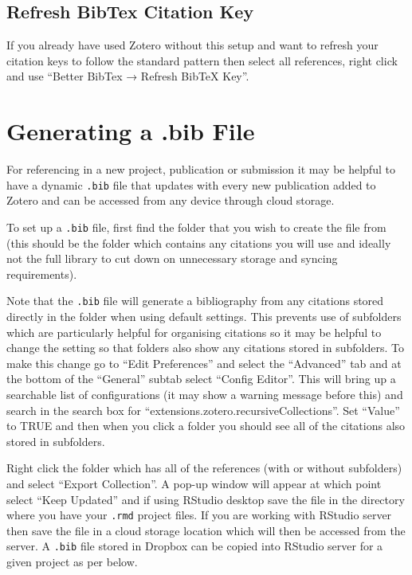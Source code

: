 \documentclass[]{book}
\begin{document}
\hypertarget{refresh-bibtex-citation-key}{%
\subsection{Refresh BibTex Citation Key}\label{refresh-bibtex-citation-key}}

If you already have used Zotero without this setup and want to refresh your citation keys to follow the standard pattern then select all references, right click and use ``Better BibTex → Refresh BibTeX Key''.

\hypertarget{generating-a-.bib-file}{%
\section{Generating a .bib File}\label{generating-a-.bib-file}}

For referencing in a new project, publication or submission it may be helpful to have a dynamic \texttt{.bib} file that updates with every new publication added to Zotero and can be accessed from any device through cloud storage.

To set up a \texttt{.bib} file, first find the folder that you wish to create the file from (this should be the folder which contains any citations you will use and ideally not the full library to cut down on unnecessary storage and syncing requirements).

Note that the \texttt{.bib} file will generate a bibliography from any citations stored directly in the folder when using default settings. This prevents use of subfolders which are particularly helpful for organising citations so it may be helpful to change the setting so that folders also show any citations stored in subfolders. To make this change go to ``Edit Preferences'' and select the ``Advanced'' tab and at the bottom of the ``General'' subtab select ``Config Editor''. This will bring up a searchable list of configurations (it may show a warning message before this) and search in the search box for ``extensions.zotero.recursiveCollections''. Set ``Value'' to TRUE and then when you click a folder you should see all of the citations also stored in subfolders.

Right click the folder which has all of the references (with or without subfolders) and select ``Export Collection''. A pop-up window will appear at which point select ``Keep Updated'' and if using RStudio desktop save the file in the directory where you have your \texttt{.rmd} project files. If you are working with RStudio server then save the file in a cloud storage location which will then be accessed from the server. A \texttt{.bib} file stored in Dropbox can be copied into RStudio server for a given project as per below.
\end{document}
